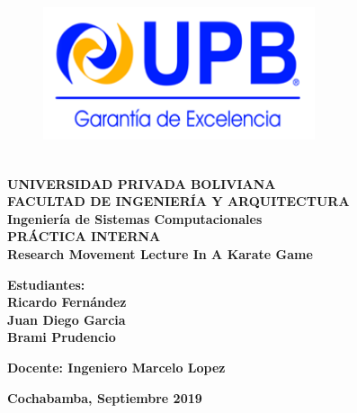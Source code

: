 \begin{titlepage}
	
	\makeatletter
	\setlength{\@fptop}{0pt}
	\makeatother
\begin{figure}[t!]
	\centering
	\includegraphics[width=8cm,height=5cm,]{./Images/Logo_Upb.png}
\end{figure}
\begin{center}
	\textbf{
		\large{UNIVERSIDAD PRIVADA BOLIVIANA\\
		FACULTAD DE INGENIERÍA Y ARQUITECTURA\\
		Ingeniería de Sistemas Computacionales\\[1cm]}
		\huge{PRÁCTICA INTERNA}\\[2cm]
		\Huge{Research Movement Lecture In A Karate Game}
	}\\[3cm]
\end{center} 
\textbf{Estudiantes: \\}
\textbf{
		Ricardo Fernández\\
		Juan Diego Garcia\\
		Brami Prudencio\\[1cm]
	}
\begin{center}
		\textbf{
		Docente:
		Ingeniero Marcelo Lopez\\[2cm]
	}
\end{center} 
	\begin{center}
		\textbf{Cochabamba, Septiembre 2019}
	\end{center}

\end{titlepage}